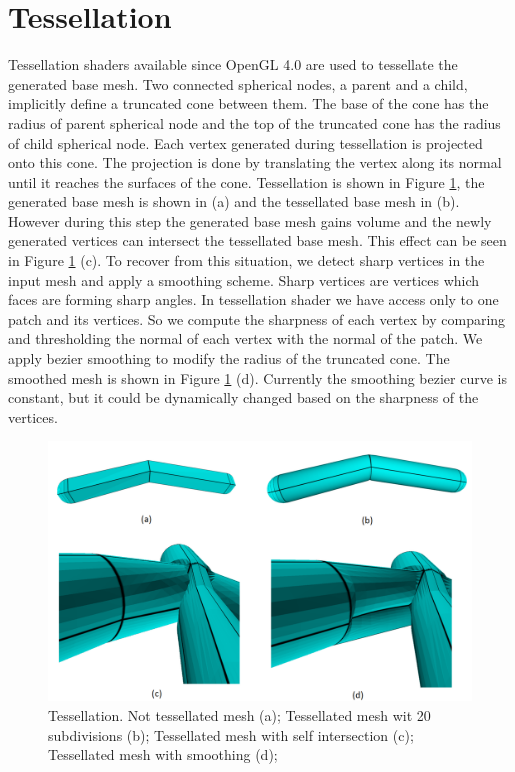 \section{Tessellation}
Tessellation shaders available since OpenGL 4.0 are used to tessellate the generated base mesh.
Two connected spherical nodes, a parent and a child, implicitly define a truncated cone between them.
The base of the cone has the radius of parent spherical node and the top of the truncated cone has the radius of child spherical node.
Each vertex generated during tessellation is projected onto this cone.
The projection is done by translating the vertex along its normal until it reaches the surfaces of the cone.
Tessellation is shown in Figure \ref{fig:tessellation_ilu}, the generated base mesh is shown in (a) and the tessellated base mesh in (b).
However during this step the generated base mesh gains volume and the newly generated vertices can intersect the tessellated base mesh.
This effect can be seen in Figure \ref{fig:tessellation_ilu} (c).
To recover from this situation, we detect sharp vertices in the input mesh and apply a smoothing scheme.
Sharp vertices are vertices which faces are forming sharp angles.
In tessellation shader we have access only to one patch and its vertices.
So we compute the sharpness of each vertex by comparing and thresholding the normal of each vertex with the normal of the patch.
We apply bezier smoothing to modify the radius of the truncated cone.
The smoothed mesh is shown in Figure \ref{fig:tessellation_ilu} (d).
Currently the smoothing bezier curve is constant, but it could be dynamically changed based on the sharpness of the vertices.

\begin{figure}[ht]
    \centering
    \includegraphics[width=0.9\linewidth]{images/tess_ilu}
    \caption[Tessellation and smoothing]{Tessellation. Not tessellated mesh (a); Tessellated mesh wit 20 subdivisions (b); Tessellated mesh with self intersection (c); Tessellated mesh with smoothing (d);}
    \label{fig:tessellation_ilu}
\end{figure}

